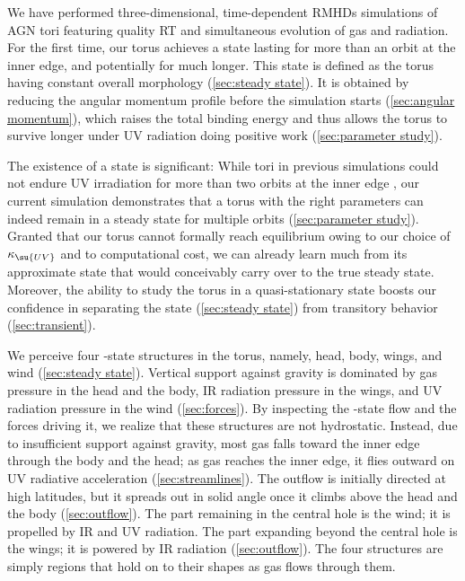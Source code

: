 \documentclass[twocolumn]{article}
\begin{document}
We have performed three-dimensional, time-dependent \acp{RMHD} simulations of
\ac{AGN} tori featuring quality \ac{RT} and simultaneous evolution of gas and
radiation. For the first time, our torus achieves a  state
lasting for more than an orbit at the inner edge, and potentially for much
longer. This  state is defined as the torus having constant
overall morphology (\cref{sec:steady state}). It is obtained by reducing the
angular momentum profile before the simulation starts (\cref{sec:angular
momentum}), which raises the total binding energy and thus allows the torus to
survive longer under \ac{UV} radiation doing positive work (\cref{sec:parameter
study}).

The existence of a  state is significant: While tori in
previous simulations could not endure \ac{UV} irradiation for more than two
orbits at the inner edge , our current
simulation demonstrates that a torus with the right parameters can indeed
remain in a steady state for multiple orbits (\cref{sec:parameter study}).
Granted that our torus cannot formally reach equilibrium owing to our choice of
$\kappa_\su{UV}$  and to computational cost, we
can already learn much from its approximate  state that would
conceivably carry over to the true steady state. Moreover, the ability to study
the torus in a quasi-stationary state boosts our confidence in separating the
 state (\cref{sec:steady state}) from transitory behavior
(\cref{sec:transient}).

We perceive four -state structures in the torus, namely,
head, body, wings, and wind (\cref{sec:steady state}). Vertical support against
gravity is dominated by gas pressure in the head and the body, \ac{IR}
radiation pressure in the wings, and \ac{UV} radiation pressure in the wind
(\cref{sec:forces}). By inspecting the -state flow and the
forces driving it, we realize that these structures are not hydrostatic.
Instead, due to insufficient support against gravity, most gas falls toward the
inner edge through the body and the head; as gas reaches the inner edge, it
flies outward on \ac{UV} radiative acceleration (\cref{sec:streamlines}). The
outflow is initially directed at high latitudes, but it spreads out in solid
angle once it climbs above the head and the body (\cref{sec:outflow}). The part
remaining in the central hole is the wind; it is propelled by \ac{IR} and
\ac{UV} radiation. The part expanding beyond the central hole is the wings; it
is powered by \ac{IR} radiation (\cref{sec:outflow}). The four structures are
simply regions that hold on to their shapes as gas flows through them.
\end{document}
